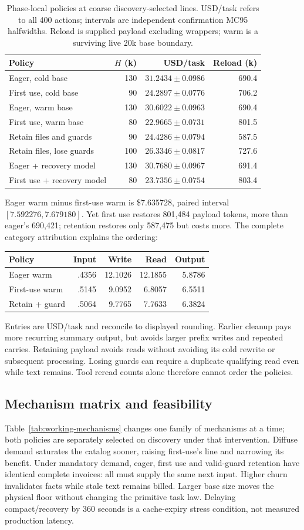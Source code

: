 \documentclass[sigconf,screen,nonacm]{acmart}
\makeatletter
\newcommand{\PaperWorkingPolicies}{%
\begin{tabular}{@{}lrrr@{}}\toprule
Policy & $H$ (k) & USD/task & Reload (k)\\\midrule
Eager, cold base & 130 & $31.2434\pm0.0986$ & 690.4\\
First use, cold base & 90 & $24.2897\pm0.0776$ & 706.2\\
Eager, warm base & 130 & $30.6022\pm0.0963$ & 690.4\\
First use, warm base & 80 & $22.9665\pm0.0731$ & 801.5\\
Retain files and guards & 90 & $24.4286\pm0.0794$ & 587.5\\
Retain files, lose guards & 100 & $26.3346\pm0.0817$ & 727.6\\
Eager + recovery model & 130 & $30.7680\pm0.0967$ & 691.4\\
First use + recovery model & 80 & $23.7356\pm0.0754$ & 803.4\\\bottomrule
\end{tabular}}
\makeatother
\begin{document}
\begin{table}[t]
\centering\small
\caption{Phase-local policies at coarse discovery-selected lines.
USD/task refers to all 400 actions; intervals are independent confirmation
MC95 halfwidths. Reload is supplied payload excluding wrappers; warm is
a surviving live 20k base boundary.}
\label{tab:working-policies}\PaperWorkingPolicies
\end{table}

Eager warm minus first-use warm is \$7.635728, paired interval
$[7.592276,7.679180]$. Yet first use restores 801,484 payload tokens,
more than eager's 690,421; retention restores only 587,475 but costs more.
The complete category attribution explains the ordering:
\begin{center}\small
\begin{tabular}{@{}lrrrr@{}}\toprule
Policy & Input & Write & Read & Output\\\midrule
Eager warm & .4356 &12.1026&12.1855&5.8786\\
First-use warm & .5145&9.0952&6.8057&6.5511\\
Retain + guard & .5064&9.7765&7.7633&6.3824\\\bottomrule
\end{tabular}
\end{center}
Entries are USD/task and reconcile to displayed rounding. Earlier cleanup
pays more recurring summary output, but avoids larger prefix writes and
repeated carries. Retaining payload avoids reads without avoiding its cold
rewrite or subsequent processing. Losing guards can require a duplicate
qualifying read even while text remains. Tool reread counts alone therefore
cannot order the policies.

\subsection{Mechanism matrix and feasibility}
Table~\ref{tab:working-mechanisms} changes one family of mechanisms at a time;
both policies are separately selected on discovery under that intervention.
Diffuse demand saturates the catalog sooner, raising first-use's line and
narrowing its benefit. Under mandatory demand, eager, first use and
valid-guard retention have identical complete invoices: all must supply the
same next input. Higher churn invalidates facts while stale text remains
billed. Larger base size moves the physical floor without changing the
primitive task law. Delaying compact/recovery by 360 seconds is a cache-expiry
stress condition, not measured production latency.
\end{document}
